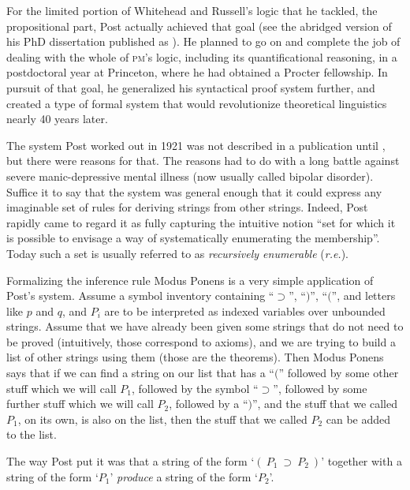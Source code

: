 \documentclass[output=paper]{langscibook}
\begin{document}
For the limited portion of  Whitehead and Russell's logic that he tackled, the propositional part, Post actually achieved that goal (see the abridged version of his PhD dissertation published as \citealt{Post21}). He planned to go on and complete the job of dealing with the whole of \textsc{pm}'s logic, including its quantificational reasoning, in a postdoctoral year at Princeton, where he had obtained a Procter fellowship. In pursuit of that goal, he generalized his syntactical proof system further, and created a type of formal system that would revolutionize theoretical linguistics nearly 40 years later.

The system Post worked out in 1921 was not described in a publication until \citeyear{Post43}, but there were reasons for that. The reasons had to do with a long battle against severe manic-depressive mental illness (now usually called bipolar disorder). Suffice it to say that the system was general enough that it could express any imaginable set of rules for deriving strings from other strings. Indeed, Post rapidly came to regard it as fully capturing the intuitive notion ``set for which it is possible to envisage a way of systematically enumerating the membership''. Today such a set is usually referred to as \emph{recursively enumerable} (\emph{r.e.}).

Formalizing the inference rule Modus Ponens is a very simple application of Post's system. Assume a symbol inventory containing ``$\supset$'', ``$)$'', ``$($'', and letters like $p$ and $q$, and $P_i$ are to be interpreted as indexed variables over unbounded strings.  Assume that we have already been given some strings that do not need to be proved (intuitively, those correspond to axioms), and we are trying to build a list of other strings using them (those are the theorems).  Then Modus Ponens says that if we can find a string on our list that has a ``$($'' followed by some other stuff which we will call $P_1$, followed by the symbol ``$\supset$'', followed by some further stuff which we will call $P_2$, followed by a ``$)$'', and the stuff that we called $P_1$, on its own, is also on the list, then the stuff that we called $P_2$ can be added to the list.

The way Post put it was that a string of the form `$(\:P_1\:\supset\:P_2\:)$' together with a string of the form `$P_1$' \emph{produce} a string of the form `$P_2$'.
\end{document}
